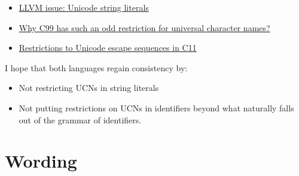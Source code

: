 \documentclass{wg21}
\begin{document}
\begin{itemize}
\item \href{https://github.com/llvm/llvm-project/issues/36392}{LLVM issue: Unicode string literals}
\item \href{https://stackoverflow.com/questions/20158472/why-c99-has-such-an-odd-restriction-for-universal-character-names}{Why C99 has such an odd restriction for universal character names?}
\item \href{https://stackoverflow.com/questions/62759943/restrictions-to-unicode-escape-sequences-in-c11}{Restrictions to Unicode escape sequences in C11}
\end{itemize}

I hope that both languages regain consistency by:
\begin{itemize}
\item Not restricting UCNs in string literals
\item Not putting restrictions on UCNs in identifiers beyond what naturally falls out of the grammar of identifiers.
\end{itemize}

\section{Wording}

%
%
%
\end{document}
